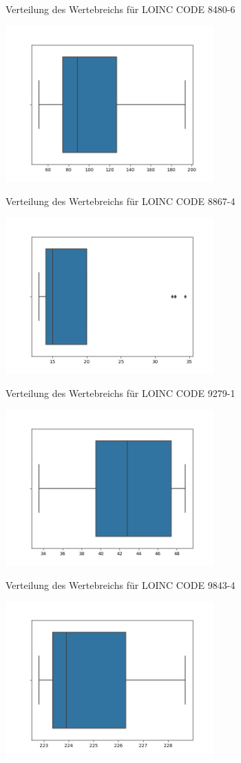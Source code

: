 \documentclass[12pt,a4paper,toc=bibliographynumbered,toc=indenttextentries]{scrreprt}
\begin{document}
\begin{center}
			\small{Verteilung des Wertebreichs für LOINC CODE 8480-6}
			
			\includegraphics[width=8cm]{Graphs/8867-4.png}
			
			\small{Verteilung des Wertebreichs für LOINC CODE 8867-4}
			
			\includegraphics[width=8cm]{Graphs/9279-1.png}
			
			\small{Verteilung des Wertebreichs für LOINC CODE 9279-1}
			
			\includegraphics[width=8cm]{Graphs/9843-4.png}
			
			\small{Verteilung des Wertebreichs für LOINC CODE 9843-4}
			
			\includegraphics[width=8cm]{Graphs/14804-9.png}
			

\end{center}
\end{document}
